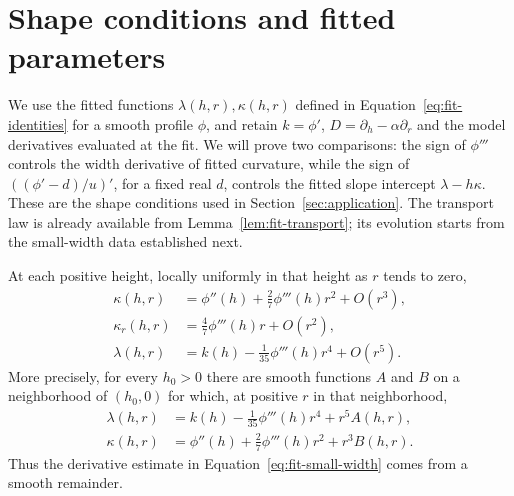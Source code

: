 \section{Shape conditions and fitted parameters}\label{sec:transport}

We use the fitted functions $\lambda(h,r),\kappa(h,r)$ defined in
Equation~\eqref{eq:fit-identities} for a smooth profile $\phi$,
and retain $k=\phi'$, $D=\partial_h-\alpha\partial_r$ and the
model derivatives evaluated at the fit. We will prove two comparisons:
the sign of $\phi'''$ controls the width derivative of fitted curvature,
while the sign of $((\phi'-d)/u)'$, for a fixed real $d$, controls
the fitted slope intercept $\lambda-h\kappa$.
These are the shape conditions used in Section~\ref{sec:application}.
The transport law is already available from
Lemma~\ref{lem:fit-transport}; its evolution starts from the
small-width data established next.

\begin{lemma}\label{lem:fit-small-width}
At each positive height, locally uniformly in that height as $r$ tends
to zero,
\begin{equation}\label{eq:fit-small-width}
 \begin{aligned}
 \kappa(h,r)&=\phi''(h)+\frac{2}{7}\phi'''(h)r^2+O(r^3),\\
 \kappa_r(h,r)&=\frac{4}{7}\phi'''(h)r+O(r^2),\\
 \lambda(h,r)&=k(h)-\frac{1}{35}\phi'''(h)r^4+O(r^5).
 \end{aligned}
\end{equation}
More precisely, for every $h_0>0$ there are smooth functions $A$ and
$B$ on a neighborhood of $(h_0,0)$ for which, at positive $r$ in that
neighborhood,
\begin{equation}\label{eq:fit-smooth-remainders}
 \begin{aligned}
 \lambda(h,r)&=k(h)-\frac{1}{35}\phi'''(h)r^4+r^5 A(h,r),\\
 \kappa(h,r)&=\phi''(h)+\frac{2}{7}\phi'''(h)r^2+r^3 B(h,r).
 \end{aligned}
\end{equation}
Thus the derivative estimate in Equation~\eqref{eq:fit-small-width}
comes from a smooth remainder.
\end{lemma}

